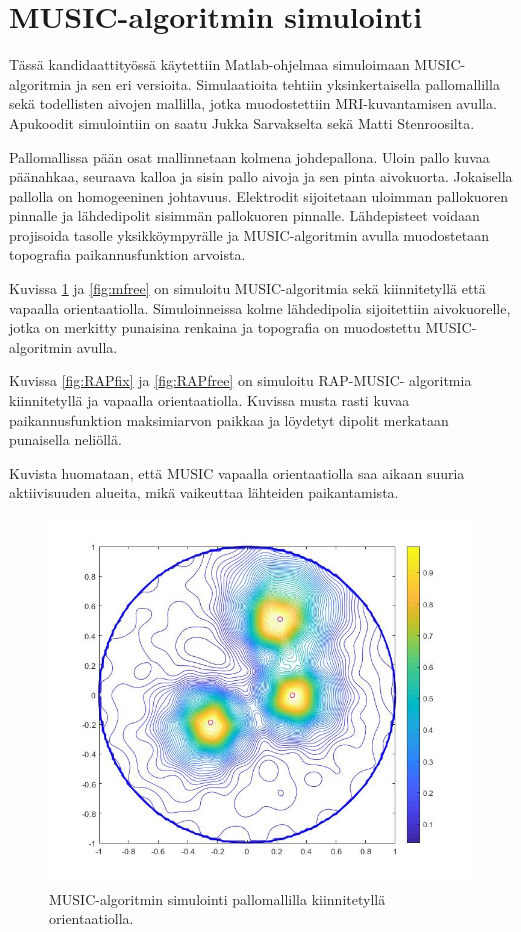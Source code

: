 \section{MUSIC-algoritmin simulointi}
Tässä kandidaattityössä käytettiin Matlab-ohjelmaa simuloimaan MUSIC-algoritmia ja sen eri versioita. Simulaatioita tehtiin yksinkertaisella pallomallilla sekä todellisten aivojen mallilla, jotka muodostettiin MRI-kuvantamisen avulla. Apukoodit simulointiin on saatu Jukka Sarvakselta sekä Matti Stenroosilta.

Pallomallissa pään osat mallinnetaan kolmena johdepallona. Uloin pallo kuvaa päänahkaa, seuraava kalloa ja sisin pallo aivoja ja sen pinta aivokuorta. Jokaisella pallolla on homogeeninen johtavuus. 
Elektrodit sijoitetaan uloimman pallokuoren pinnalle ja lähdedipolit sisimmän pallokuoren pinnalle. Lähdepisteet voidaan projisoida tasolle yksikköympyrälle ja MUSIC-algoritmin avulla muodostetaan topografia paikannusfunktion arvoista.

Kuvissa \ref{fig:mfix} ja \ref{fig:mfree} on simuloitu MUSIC-algoritmia sekä kiinnitetyllä että vapaalla orientaatiolla. Simuloinneissa kolme lähdedipolia sijoitettiin aivokuorelle, jotka on merkitty punaisina renkaina ja topografia on muodostettu MUSIC-algoritmin avulla.

Kuvissa \ref{fig:RAPfix} ja \ref{fig:RAPfree} on simuloitu RAP-MUSIC- algoritmia kiinnitetyllä ja vapaalla orientaatiolla. Kuvissa musta rasti kuvaa paikannusfunktion maksimiarvon paikkaa ja löydetyt dipolit merkataan punaisella neliöllä.

Kuvista huomataan, että MUSIC vapaalla orientaatiolla saa aikaan suuria aktiivisuuden alueita, mikä vaikeuttaa lähteiden paikantamista.


\clearpage
\begin{figure}[h]
    \centering
    \includegraphics[scale=0.38]{mfix.jpg}
    \caption{MUSIC-algoritmin simulointi pallomallilla kiinnitetyllä orientaatiolla.}
    \label{fig:mfix}
\end{figure}

